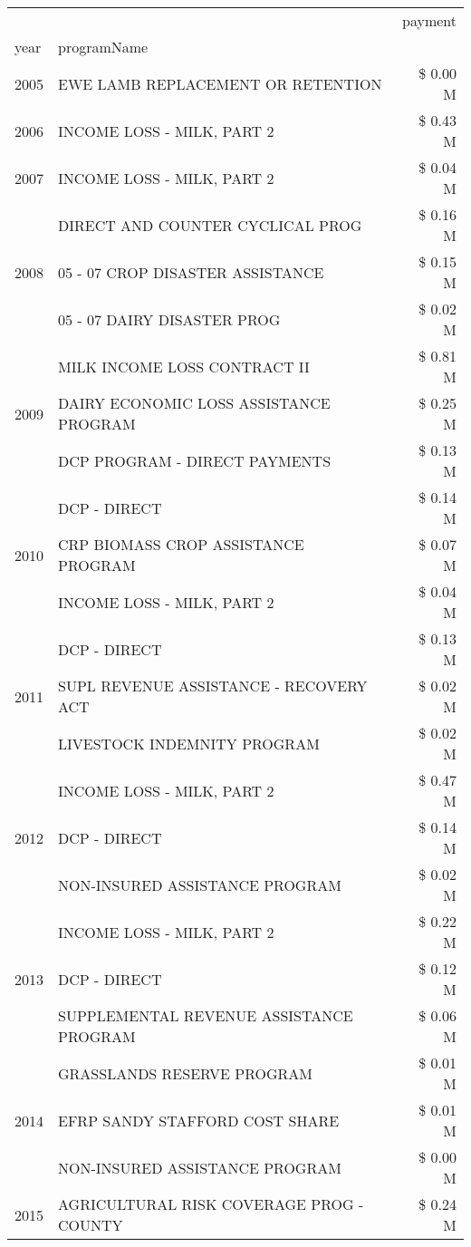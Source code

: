 \begin{tabular}{llr}
\toprule
 &  & payment \\
year & programName &  \\
\midrule
2005 & EWE LAMB REPLACEMENT OR RETENTION & \$ 0.00 M \\
\cline{1-3}
2006 & INCOME LOSS - MILK, PART 2 & \$ 0.43 M \\
\cline{1-3}
2007 & INCOME LOSS - MILK, PART 2 & \$ 0.04 M \\
\cline{1-3}
\multirow[t]{3}{*}{2008} & DIRECT AND COUNTER CYCLICAL PROG & \$ 0.16 M \\
 & 05 - 07 CROP DISASTER ASSISTANCE & \$ 0.15 M \\
 & 05 - 07 DAIRY DISASTER PROG & \$ 0.02 M \\
\cline{1-3}
\multirow[t]{3}{*}{2009} & MILK INCOME LOSS CONTRACT II & \$ 0.81 M \\
 & DAIRY ECONOMIC LOSS ASSISTANCE PROGRAM & \$ 0.25 M \\
 & DCP PROGRAM - DIRECT PAYMENTS & \$ 0.13 M \\
\cline{1-3}
\multirow[t]{3}{*}{2010} & DCP - DIRECT & \$ 0.14 M \\
 & CRP BIOMASS CROP ASSISTANCE PROGRAM & \$ 0.07 M \\
 & INCOME LOSS - MILK, PART 2 & \$ 0.04 M \\
\cline{1-3}
\multirow[t]{3}{*}{2011} & DCP - DIRECT & \$ 0.13 M \\
 & SUPL REVENUE ASSISTANCE - RECOVERY ACT & \$ 0.02 M \\
 & LIVESTOCK INDEMNITY PROGRAM & \$ 0.02 M \\
\cline{1-3}
\multirow[t]{3}{*}{2012} & INCOME LOSS - MILK, PART 2 & \$ 0.47 M \\
 & DCP - DIRECT & \$ 0.14 M \\
 & NON-INSURED ASSISTANCE PROGRAM & \$ 0.02 M \\
\cline{1-3}
\multirow[t]{3}{*}{2013} & INCOME LOSS - MILK, PART 2 & \$ 0.22 M \\
 & DCP - DIRECT & \$ 0.12 M \\
 & SUPPLEMENTAL REVENUE ASSISTANCE PROGRAM & \$ 0.06 M \\
\cline{1-3}
\multirow[t]{3}{*}{2014} & GRASSLANDS RESERVE PROGRAM & \$ 0.01 M \\
 & EFRP SANDY STAFFORD COST SHARE & \$ 0.01 M \\
 & NON-INSURED ASSISTANCE PROGRAM & \$ 0.00 M \\
\cline{1-3}
\multirow[t]{3}{*}{2015} & AGRICULTURAL RISK COVERAGE PROG - COUNTY & \$ 0.24 M \\

\end{tabular}
